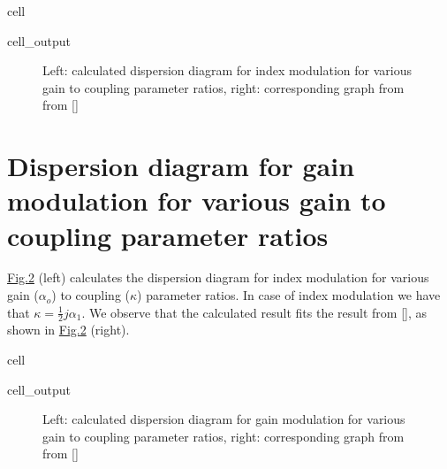 \documentclass[a4paper,10pt,english,openany,oneside]{jupyterBook}
\begin{document}
\begin{sphinxuseclass}{cell}\begin{sphinxVerbatimOutput}

\begin{sphinxuseclass}{cell_output}
\begin{figure}[htbp]
\centering
\capstart

\noindent{}
\caption{Left: calculated dispersion diagram for index modulation for various gain to coupling parameter ratios, right: corresponding graph from from {[}{]}}\label{\detokenize{Kogelnik-Shank_Coupled-Wave-Theory_DFB-Lasers:kogelnik1}}\end{figure}

\end{sphinxuseclass}\end{sphinxVerbatimOutput}

\end{sphinxuseclass}

\section{Dispersion diagram for gain modulation for various gain to coupling parameter ratios}
\label{\detokenize{Kogelnik-Shank_Coupled-Wave-Theory_DFB-Lasers:dispersion-diagram-for-gain-modulation-for-various-gain-to-coupling-parameter-ratios}}
\sphinxAtStartPar
\hyperref[\detokenize{Kogelnik-Shank_Coupled-Wave-Theory_DFB-Lasers:kogelnik3}]{Fig.\@ \ref{\detokenize{Kogelnik-Shank_Coupled-Wave-Theory_DFB-Lasers:kogelnik3}}} (left) calculates the dispersion diagram for index modulation for various gain (\(\alpha_o\)) to coupling (\(\kappa\)) parameter ratios. In case of index modulation we have that \(\kappa= \frac{1}{2} j \alpha_1\). We observe that the calculated result fits the result from {[}{]}, as shown in \hyperref[\detokenize{Kogelnik-Shank_Coupled-Wave-Theory_DFB-Lasers:kogelnik3}]{Fig.\@ \ref{\detokenize{Kogelnik-Shank_Coupled-Wave-Theory_DFB-Lasers:kogelnik3}}} (right).

\begin{sphinxuseclass}{cell}\begin{sphinxVerbatimOutput}

\begin{sphinxuseclass}{cell_output}
\begin{figure}[htbp]
\centering
\capstart

\noindent{}
\caption{Left: calculated dispersion diagram for gain modulation for various gain to coupling parameter ratios, right: corresponding graph from from {[}{]}}\label{\detokenize{Kogelnik-Shank_Coupled-Wave-Theory_DFB-Lasers:kogelnik3}}\end{figure}

\end{sphinxuseclass}\end{sphinxVerbatimOutput}

\end{sphinxuseclass}
\end{document}
